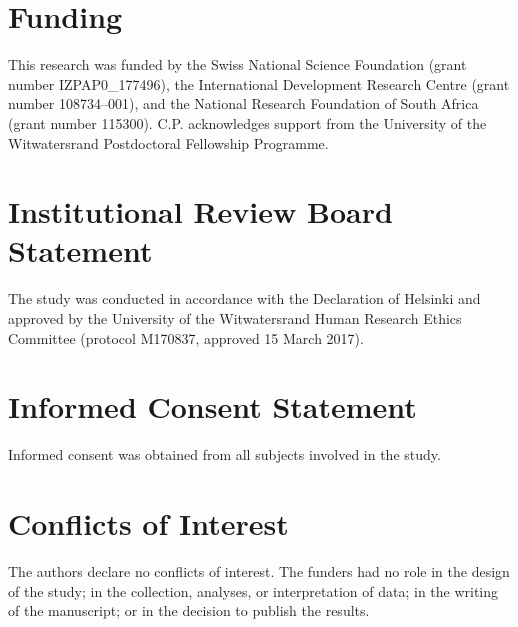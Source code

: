 \documentclass[11pt,a4paper]{article}
\begin{document}
\section*{Funding}

This research was funded by the Swiss National Science Foundation (grant number IZPAP0\_177496), the International Development Research Centre (grant number 108734--001), and the National Research Foundation of South Africa (grant number 115300). C.P. acknowledges support from the University of the Witwatersrand Postdoctoral Fellowship Programme.

\section*{Institutional Review Board Statement}

The study was conducted in accordance with the Declaration of Helsinki and approved by the University of the Witwatersrand Human Research Ethics Committee (protocol M170837, approved 15 March 2017).

\section*{Informed Consent Statement}

Informed consent was obtained from all subjects involved in the study.

\section*{Conflicts of Interest}

The authors declare no conflicts of interest. The funders had no role in the design of the study; in the collection, analyses, or interpretation of data; in the writing of the manuscript; or in the decision to publish the results.
\end{document}
